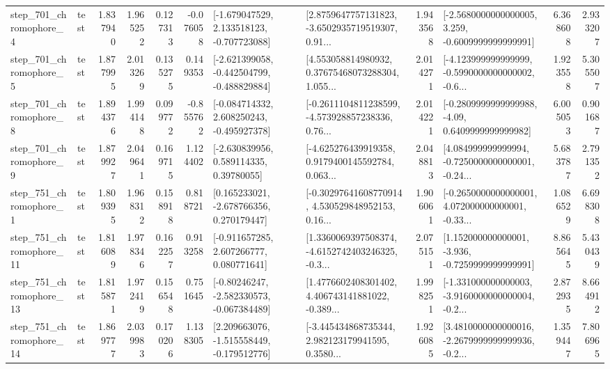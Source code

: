 \begin{tabular}{llrrrrllrlrr}
   step\_701\_chromophore\_4 &      test &      1.837940 &    1.965252 &      0.127313 & -0.076058 &   [-1.679047529, 2.133518123, -0.707723088] &  [2.8759647757131823, -3.6502935719519307, 0.91... &       1.943568 &  [-2.5680000000000005, 3.259, -0.6009999999999991] &            6.368608 &          2.933207 \\
   step\_701\_chromophore\_5 &      test &      1.877995 &    2.013269 &      0.135275 &  0.149353 &  [-2.621399058, -0.442504799, -0.488829884] &  [4.553058814980932, 0.37675468073288304, 1.055... &       2.014271 &  [-4.123999999999999, -0.5990000000000002, -0.6... &            1.923558 &          5.305507 \\
   step\_701\_chromophore\_8 &      test &      1.894376 &    1.994148 &      0.099772 & -0.855762 &   [-0.084714332, 2.608250243, -0.495927378] &  [-0.2611104811238599, -4.573928857238336, 0.76... &       2.014221 &   [-0.2809999999999988, -4.09, 0.6409999999999982] &            6.005053 &          0.901687 \\
   step\_701\_chromophore\_9 &      test &      1.879927 &    2.049641 &      0.169715 &  1.124402 &     [-2.630839956, 0.589114335, 0.39780055] &  [-4.625276439919358, 0.9179400145592784, 0.063... &       2.048813 &  [4.084999999999994, -0.7250000000000001, -0.24... &            5.683787 &          2.791352 \\
   step\_751\_chromophore\_1 &      test &      1.809395 &    1.968312 &      0.158918 &  0.818721 &    [0.165233021, -2.678766356, 0.270179447] &  [-0.30297641608770914, 4.530529848952153, 0.16... &       1.906061 &  [-0.2650000000000001, 4.072000000000001, -0.33... &            1.086529 &          6.698308 \\
  step\_751\_chromophore\_11 &      test &      1.816089 &    1.978346 &      0.162257 &  0.913258 &    [-0.911657285, 2.607266777, 0.080771641] &  [1.3360069397508374, -4.6152742403246325, -0.3... &       2.075151 &   [1.152000000000001, -3.936, -0.7259999999999991] &            8.865645 &          5.430439 \\
  step\_751\_chromophore\_13 &      test &      1.815871 &    1.972419 &      0.156548 &  0.751645 &   [-0.80246247, -2.582330573, -0.067384489] &  [1.4776602408301402, 4.406743141881022, -0.389... &       1.998251 &  [-1.331000000000003, -3.9160000000000004, -0.2... &            2.872935 &          8.664912 \\
  step\_751\_chromophore\_14 &      test &      1.869777 &    2.039983 &      0.170206 &  1.138305 &   [2.209663076, -1.515558449, -0.179512776] &  [-3.445434868735344, 2.982123179941595, 0.3580... &       1.926085 &  [3.4810000000000016, -2.2679999999999936, -0.2... &            1.359447 &          7.806965 \\

\end{tabular}
